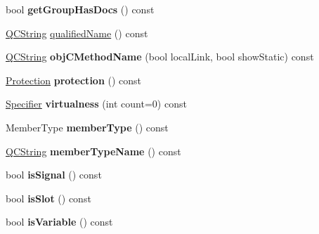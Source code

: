 \begin{DoxyCompactItemize}
\item 
\hypertarget{class_member_def_a9249b746390f493eaed8c9e9e07bb616}{bool {\bfseries get\-Group\-Has\-Docs} () const }\label{class_member_def_a9249b746390f493eaed8c9e9e07bb616}

\item 
\hyperlink{class_q_c_string}{Q\-C\-String} \hyperlink{class_member_def_ab8b1c377b3cff112fdca997c37007944}{qualified\-Name} () const 
\item 
\hypertarget{class_member_def_abb21b91f09af3a120cc83a750b09fb85}{\hyperlink{class_q_c_string}{Q\-C\-String} {\bfseries obj\-C\-Method\-Name} (bool local\-Link, bool show\-Static) const }\label{class_member_def_abb21b91f09af3a120cc83a750b09fb85}

\item 
\hypertarget{class_member_def_a149b66b75ad6cd6c17457a689e68cd9e}{\hyperlink{types_8h_a90e352184df58cd09455fe9996cd4ded}{Protection} {\bfseries protection} () const }\label{class_member_def_a149b66b75ad6cd6c17457a689e68cd9e}

\item 
\hypertarget{class_member_def_ab219c1d82183fa38d9b2e5c831379fa8}{\hyperlink{types_8h_ab16236bdd10ddf4d73a9847350f0017e}{Specifier} {\bfseries virtualness} (int count=0) const }\label{class_member_def_ab219c1d82183fa38d9b2e5c831379fa8}

\item 
\hypertarget{class_member_def_a4185ff800def732db2b10383099fdbbd}{Member\-Type {\bfseries member\-Type} () const }\label{class_member_def_a4185ff800def732db2b10383099fdbbd}

\item 
\hypertarget{class_member_def_a8752924926fe1365b7f0089c32a80eda}{\hyperlink{class_q_c_string}{Q\-C\-String} {\bfseries member\-Type\-Name} () const }\label{class_member_def_a8752924926fe1365b7f0089c32a80eda}

\item 
\hypertarget{class_member_def_ab0fae4d9d9a3aa33411f72858436d75d}{bool {\bfseries is\-Signal} () const }\label{class_member_def_ab0fae4d9d9a3aa33411f72858436d75d}

\item 
\hypertarget{class_member_def_af3f8ed0da6b1d81642a5b45ab005e076}{bool {\bfseries is\-Slot} () const }\label{class_member_def_af3f8ed0da6b1d81642a5b45ab005e076}

\item 
\hypertarget{class_member_def_a97b9fd0a9dd72476a300bc8ef5b11a02}{bool {\bfseries is\-Variable} () const }\label{class_member_def_a97b9fd0a9dd72476a300bc8ef5b11a02}


\end{DoxyCompactItemize}
